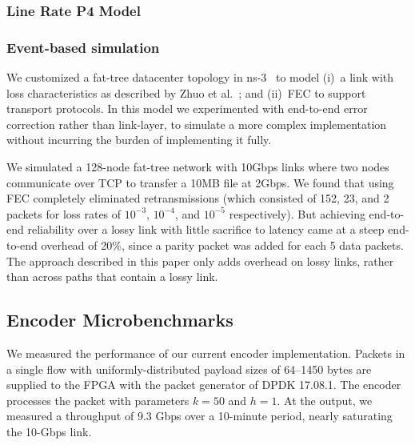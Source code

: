 \subsubsection{Line Rate P4 Model} 




\subsubsection{Event-based simulation}
We customized a fat-tree datacenter topology in ns-3~\cite{ns3-dcn} to
model (i)~a link with loss characteristics as described by Zhuo et
al.~\cite{Zhuo:2017:UMP:3098822.3098849}; and (ii)~FEC to support
transport protocols. In this model we experimented with end-to-end
error correction rather than link-layer, to simulate a more complex
implementation without incurring the burden of implementing it fully.

We simulated a 128-node fat-tree network with 10Gbps links where two
nodes communicate over TCP to transfer a 10MB file at 2Gbps. We found
that using FEC completely eliminated retransmissions (which consisted
  of 152, 23, and 2 packets for loss rates of $10^{-3}$, $10^{-4}$,
and $10^{-5}$ respectively). But achieving end-to-end reliability
over a lossy link with little sacrifice to latency came at a steep
end-to-end overhead of 20\%, since a parity packet was added for each
5 data packets. The approach described in this paper only adds
overhead on lossy links, rather than across paths that contain a
lossy link.


\subsection{Encoder Microbenchmarks}

We measured the performance of our current encoder implementation.  Packets
in a single flow with uniformly-distributed payload sizes of 64--1450 bytes are
supplied to the FPGA with the packet generator of DPDK 17.08.1. The encoder
processes the packet with parameters $k = 50$ and $h = 1$.
At the output, we measured a throughput of 9.3 Gbps over a 10-minute period,
nearly saturating the 10-Gbps link.

